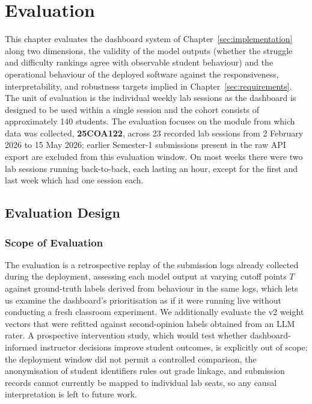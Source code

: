 \section{Evaluation} \label{sec:evaluation}


This chapter evaluates the dashboard system of Chapter~\ref{sec:implementation} along two dimensions, the validity of the model outputs (whether the struggle and difficulty rankings agree with observable student behaviour) and the operational behaviour of the deployed software against the responsiveness, interpretability, and robustness targets implied in Chapter~\ref{sec:requirements}. 
The unit of evaluation is the individual weekly lab sessions as the dashboard is designed to be used within a single session and the cohort consists of approximately 140 students. The evaluation focuses on the module from which data was collected, \textbf{25COA122}, across 23 recorded lab sessions from 2 February 2026 to 15 May 2026; earlier Semester-1 submissions present in the raw API export are excluded from this evaluation window.
On most weeks there were two lab sessions running back-to-back, each lasting an hour, except for the first and last week which had one session each.

\subsection{Evaluation Design} \label{sec:eval-design}

\subsubsection{Scope of Evaluation}
The evaluation is a retrospective replay of the submission logs already collected during the deployment, assessing each model output at varying cutoff points \(T\) against ground-truth labels derived from behaviour in the same logs, which lets us examine the dashboard's prioritisation as if it were running live without conducting a fresh classroom experiment.
We additionally evaluate the v2 weight vectors that were refitted against second-opinion labels obtained from an LLM rater.
A prospective intervention study, which would test whether dashboard-informed instructor decisions improve student outcomes, is explicitly out of scope; the deployment window did not permit a controlled comparison, the anonymisation of student identifiers rules out grade linkage, and submission records cannot currently be mapped to individual lab seats, so any causal interpretation is left to future work.

